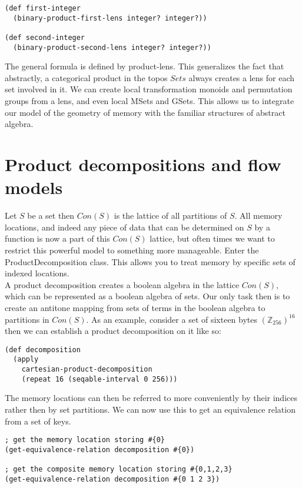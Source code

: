 \documentclass[a4paper,11pt]{report}
\begin{document}
\lstset {language=Lisp}
\begin{lstlisting}
(def first-integer 
  (binary-product-first-lens integer? integer?))
  
(def second-integer 
  (binary-product-second-lens integer? integer?))
\end{lstlisting}

The general formula is defined by product-lens. This generalizes the fact that abstractly, a categorical product in the topos $Sets$ always creates a lens for each set involved in it. We can create local transformation monoids and permutation groups from a lens, and even local MSets and GSets. This allows us to integrate our model of the geometry of memory with the familiar structures of abstract algebra.

\newpage 

\section{Product decompositions and flow models}
Let $S$ be a set then $Con(S)$ is the lattice of all partitions of $S$. All memory locations, and indeed any piece of data that can be determined on $S$ by a function is now a part of this $Con(S)$ lattice, but often times we want to restrict this powerful model to something more manageable. Enter the ProductDecomposition class. This allows you to treat memory by specific sets of indexed locations. \\

A product decomposition creates a boolean algebra in the lattice $Con(S)$, which can be represented as a boolean algebra of sets. Our only task then is to create an antitone mapping from sets of terms in the boolean algebra to partitions in $Con(S)$. As an example, consider a set of sixteen bytes $(\mathbb{Z}_{256})^{16}$ then we can establish a product decomposition on it like so:

\lstset {language=Lisp}
\begin{lstlisting}
(def decomposition 
  (apply 
    cartesian-product-decomposition 
    (repeat 16 (seqable-interval 0 256)))
\end{lstlisting}

The memory locations can then be referred to more conveniently by their indices rather then by set partitions. We can now use this to get an equivalence relation from a set of keys.

\lstset {language=Lisp}
\begin{lstlisting}
; get the memory location storing #{0}
(get-equivalence-relation decomposition #{0})

; get the composite memory location storing #{0,1,2,3}
(get-equivalence-relation decomposition #{0 1 2 3})
\end{lstlisting}
\end{document}
